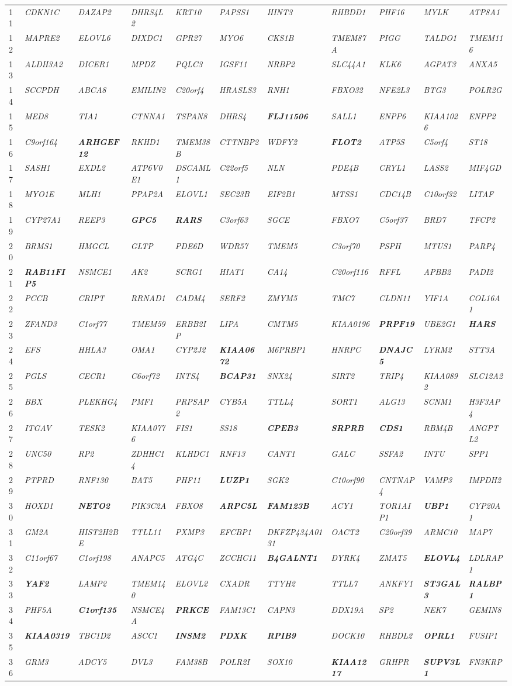 \documentclass[letterpaper,12pt]{article}
\numberwithin{equation}{appendix}
\begin{document}
\begin{landscape}
{{\begin{longtable}{l >{\itshape}l >{\itshape}l >{\itshape}l >{\itshape}l >{\itshape}l >{\itshape}l >{\itshape}l >{\itshape}l >{\itshape}l >{\itshape}l}
11&CDKN1C&DAZAP2&DHRS4L2&KRT10&PAPSS1&HINT3&RHBDD1&PHF16&MYLK&ATP8A1\tabularnewline
12&MAPRE2&ELOVL6&DIXDC1&GPR27&MYO6&CKS1B&TMEM87A&PIGG&TALDO1&TMEM116\tabularnewline
13&ALDH3A2&DICER1&MPDZ&PQLC3&IGSF11&NRBP2&SLC44A1&KLK6&AGPAT3&ANXA5\tabularnewline
14&SCCPDH&ABCA8&EMILIN2&C20orf4&HRASLS3&RNH1&FBXO32&NFE2L3&BTG3&POLR2G\tabularnewline
15&MED8&TIA1&CTNNA1&TSPAN8&DHRS4&{\bfseries {FLJ11506}}&SALL1&ENPP6&KIAA1026&ENPP2\tabularnewline
16&C9orf164&{\bfseries {ARHGEF12}}&RKHD1&TMEM38B&CTTNBP2&WDFY2&{\bfseries {FLOT2}}&ATP5S&C5orf4&ST18\tabularnewline
17&SASH1&EXDL2&ATP6V0E1&DSCAML1&C22orf5&NLN&PDE4B&CRYL1&LASS2&MIF4GD\tabularnewline
18&MYO1E&MLH1&PPAP2A&ELOVL1&SEC23B&EIF2B1&MTSS1&CDC14B&C10orf32&LITAF\tabularnewline
19&CYP27A1&REEP3&{\bfseries {GPC5}}&{\bfseries {RARS}}&C3orf63&SGCE&FBXO7&C5orf37&BRD7&TFCP2\tabularnewline
20&BRMS1&HMGCL&GLTP&PDE6D&WDR57&TMEM5&C3orf70&PSPH&MTUS1&PARP4\tabularnewline
21&{\bfseries {RAB11FIP5}}&NSMCE1&AK2&SCRG1&HIAT1&CA14&C20orf116&RFFL&APBB2&PADI2\tabularnewline
22&PCCB&CRIPT&RRNAD1&CADM4&SERF2&ZMYM5&TMC7&CLDN11&YIF1A&COL16A1\tabularnewline
23&ZFAND3&C1orf77&TMEM59&ERBB2IP&LIPA&CMTM5&KIAA0196&{\bfseries {PRPF19}}&UBE2G1&{\bfseries {HARS}}\tabularnewline
24&EFS&HHLA3&OMA1&CYP2J2&{\bfseries {KIAA0672}}&M6PRBP1&HNRPC&{\bfseries {DNAJC5}}&LYRM2&STT3A\tabularnewline
25&PGLS&CECR1&C6orf72&INTS4&{\bfseries {BCAP31}}&SNX24&SIRT2&TRIP4&KIAA0892&SLC12A2\tabularnewline
26&BBX&PLEKHG4&PMF1&PRPSAP2&CYB5A&TTLL4&SORT1&ALG13&SCNM1&H3F3AP4\tabularnewline
27&ITGAV&TESK2&KIAA0776&FIS1&SS18&{\bfseries {CPEB3}}&{\bfseries {SRPRB}}&{\bfseries {CDS1}}&RBM4B&ANGPTL2\tabularnewline
28&UNC50&RP2&ZDHHC14&KLHDC1&RNF13&CANT1&GALC&SSFA2&INTU&SPP1\tabularnewline
29&PTPRD&RNF130&BAT5&PHF11&{\bfseries {LUZP1}}&SGK2&C10orf90&CNTNAP4&VAMP3&IMPDH2\tabularnewline
30&HOXD1&{\bfseries {NETO2}}&PIK3C2A&FBXO8&{\bfseries {ARPC5L}}&{\bfseries {FAM123B}}&ACY1&TOR1AIP1&{\bfseries {UBP1}}&CYP20A1\tabularnewline
31&GM2A&HIST2H2BE&TTLL11&PXMP3&EFCBP1&DKFZP434A0131&OACT2&C20orf39&ARMC10&MAP7\tabularnewline
32&C11orf67&C1orf198&ANAPC5&ATG4C&ZCCHC11&{\bfseries {B4GALNT1}}&DYRK4&ZMAT5&{\bfseries {ELOVL4}}&LDLRAP1\tabularnewline
33&{\bfseries {YAF2}}&LAMP2&TMEM140&ELOVL2&CXADR&TTYH2&TTLL7&ANKFY1&{\bfseries {ST3GAL3}}&{\bfseries {RALBP1}}\tabularnewline
34&PHF5A&{\bfseries {C1orf135}}&NSMCE4A&{\bfseries {PRKCE}}&FAM13C1&CAPN3&DDX19A&SP2&NEK7&GEMIN8\tabularnewline
35&{\bfseries {KIAA0319}}&TBC1D2&ASCC1&{\bfseries {INSM2}}&{\bfseries {PDXK}}&{\bfseries {RPIB9}}&DOCK10&RHBDL2&{\bfseries {OPRL1}}&FUSIP1\tabularnewline
36&GRM3&ADCY5&DVL3&FAM38B&POLR2I&SOX10&{\bfseries {KIAA1217}}&GRHPR&{\bfseries {SUPV3L1}}&FN3KRP\tabularnewline

\end{longtable}}}
\end{landscape}
\end{document}
